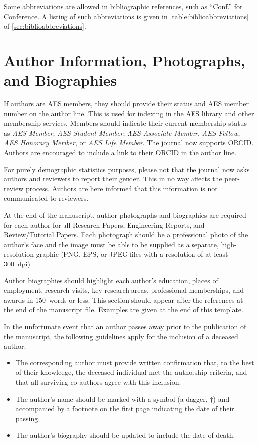 \documentclass[fleqn]{jaes}
\begin{document}
Some abbreviations are allowed in bibliographic references, such as ``Conf.'' for Conference. A listing of such abbreviations is given in \cref{table:biblioabbreviations} of \cref{sec:biblioabbreviations}.

\section{Author Information, Photographs, and Biographies}\label{sec:authophoto}
If authors are AES members, they should provide their status and AES member number on the author line. This is used for indexing in the AES library and other membership services. Members should indicate their current membership status as \emph{AES Member}, \emph{AES Student Member}, \emph{AES Associate Member}, \emph{AES Fellow}, \emph{AES Honorary Member}, or \emph{AES Life Member}.
The journal now supports ORCID. Authors are encouraged to include a link to their ORCID in the author line. 

For purely demographic statistics purposes, please not that the journal now asks authors and reviewers to report their gender. This in no way affects the peer-review process. Authors are here informed that this information is not communicated to reviewers. 

At the end of the manuscript, author photographs and biographies are required for each author for all Research Papers, Engineering Reports, and Review/Tutorial Papers. Each photograph should be a professional photo of the author’s face and the image must be able to be supplied as a separate, high-resolution graphic (PNG, EPS, or JPEG files with a resolution of at least 300~dpi). 

Author biographies should highlight each author’s education, places of employment, research visits, key research areas, professional memberships, and awards in 150~words or less. This section should appear after the references at the end of the manuscript file. Examples are given at the end of this template.

In the unfortunate event that an author passes away prior to the publication of the manuscript, the following guidelines apply for the inclusion of a deceased author:
\begin{itemize}
    \item The corresponding author must provide written confirmation that, to the best of their knowledge, the deceased individual met the authorship criteria, and that all surviving co-authors agree with this inclusion.
    \item The author's name should be marked with a symbol (a dagger, $\dagger$) and accompanied by a footnote on the first page indicating the date of their passing.
    \item The author’s biography should be updated to include the date of death.
\end{itemize}
\end{document}
